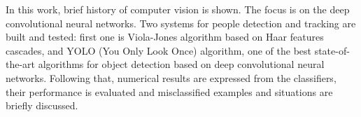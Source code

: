 In this work, brief history of computer vision is shown. The focus is on the deep convolutional neural networks. Two systems for people detection and tracking are built and tested: first one is Viola-Jones algorithm based on Haar features cascades, and YOLO (You Only Look Once) algorithm, one of the best state-of-the-art algorithms for object detection based on deep convolutional neural networks. Following that, numerical results are expressed from the classifiers, their performance is evaluated and misclassified examples and situations are briefly discussed.